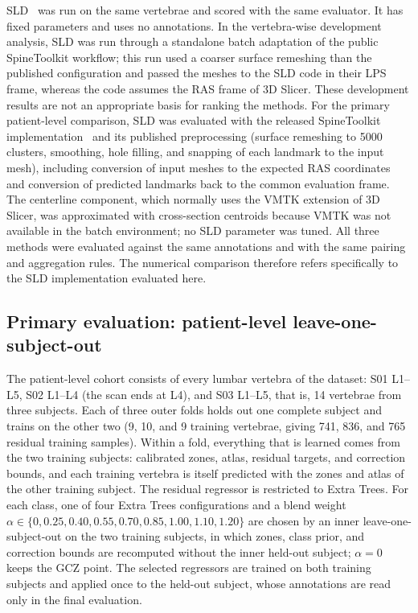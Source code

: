 \documentclass[5p,times,twocolumn,authoryear]{elsarticle}
\begin{document}
SLD~\citep{blomenkamp2026sld} was run on the same vertebrae and scored with the same evaluator. It has fixed parameters and uses no annotations. In the vertebra-wise development analysis, SLD was run through a standalone batch adaptation of the public SpineToolkit workflow; this run used a coarser surface remeshing than the published configuration and passed the meshes to the SLD code in their LPS frame, whereas the code assumes the RAS frame of 3D Slicer. These development results are not an appropriate basis for ranking the methods. For the primary patient-level comparison, SLD was evaluated with the released SpineToolkit implementation~\citep{spinetoolkit2026} and its published preprocessing (surface remeshing to 5000 clusters, smoothing, hole filling, and snapping of each landmark to the input mesh), including conversion of input meshes to the expected RAS coordinates and conversion of predicted landmarks back to the common evaluation frame. The centerline component, which normally uses the VMTK extension of 3D Slicer, was approximated with cross-section centroids because VMTK was not available in the batch environment; no SLD parameter was tuned. All three methods were evaluated against the same annotations and with the same pairing and aggregation rules. The numerical comparison therefore refers specifically to the SLD implementation evaluated here.

\subsection{Primary evaluation: patient-level leave-one-subject-out}
\label{ssec:loso}

The patient-level cohort consists of every lumbar vertebra of the dataset: S01 L1--L5, S02 L1--L4 (the scan ends at L4), and S03 L1--L5, that is, 14 vertebrae from three subjects. Each of three outer folds holds out one complete subject and trains on the other two (9, 10, and 9 training vertebrae, giving 741, 836, and 765 residual training samples). Within a fold, everything that is learned comes from the two training subjects: calibrated zones, atlas, residual targets, and correction bounds, and each training vertebra is itself predicted with the zones and atlas of the other training subject. The residual regressor is restricted to Extra Trees. For each class, one of four Extra Trees configurations and a blend weight $\alpha \in \{0, 0.25, 0.40, 0.55, 0.70, 0.85, 1.00, 1.10, 1.20\}$ are chosen by an inner leave-one-subject-out on the two training subjects, in which zones, class prior, and correction bounds are recomputed without the inner held-out subject; $\alpha=0$ keeps the GCZ point. The selected regressors are trained on both training subjects and applied once to the held-out subject, whose annotations are read only in the final evaluation.
\end{document}
